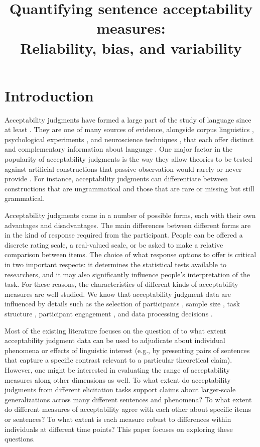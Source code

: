 \documentclass[doc]{apa6}
\title{Quantifying sentence acceptability measures: \\Reliability, bias, and variability}
\begin{document}
\vspace*{-2cm}
\maketitle
\clearpage

\section{Introduction}

Acceptability judgments have formed a large part of the study of language since at least \citet{chomsky1965aspects}. They are one of many sources of evidence, alongside corpus linguistics \citep{sampson2007corpuslinguistics}, psychological experiments \citep{noveck2008experimentalpragmatics}, and neuroscience techniques \citep{shalom2007neuro}, that each offer distinct and complementary information about language \citep{arppe2007combmethods}. One major factor in the popularity of acceptability judgments is the way they allow theories to be tested against artificial constructions that passive observation would rarely or never provide \citep{schutze1996empiricalbase}. For instance, acceptability judgments can differentiate between constructions that are ungrammatical and those that are rare or missing but still grammatical.

Acceptability judgments come in a number of possible forms, each with their own advantages and disadvantages. The main differences between different forms are in the kind of response required from the participant. People can be offered a discrete rating scale, a real-valued scale, or be asked to make a relative comparison between items. The choice of what response options to offer is critical in two important respects: it determines the statistical tests available to researchers, and it may also significantly influence people's interpretation of the task.
For these reasons, the characteristics of different kinds of acceptability measures are well studied. We know that acceptability judgment data are influenced by details such as the selection of participants \citep{dabrowska2010naivevsexpert}, sample size \citep{mahowald2016snap},
task structure \citep{featherston2008thermometer}, participant engagement \citep{haussler2017detectingnoncooperative}, and data processing decisions \citep{juzek2015acceptabilityjudgmentthesis_prozscore}.

Most of the existing literature focuses on the question of to what extent acceptability judgment data can be used to adjudicate about individual phenomena or effects of linguistic interest (e.g., by presenting pairs of sentences that capture a specific contrast relevant to a particular theoretical claim). However, one might be interested in evaluating the range of acceptability measures along other dimensions as well. To what extent do acceptability judgments from different elicitation tasks support claims about larger-scale generalizations across many different sentences and phenomena? To what extent do different measures of acceptability agree with each other about specific items or sentences? To what extent is each measure robust to differences within individuals at different time points? This paper focuses on exploring these questions.
\end{document}

